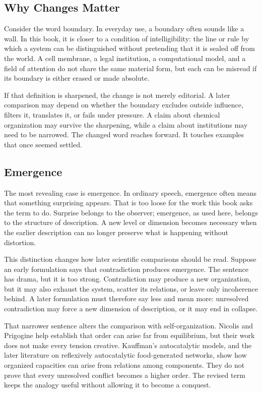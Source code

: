 \documentclass[11pt,a4paper,openany]{book}
\begin{document}
\subsection{Why Changes Matter}
Consider the word boundary. In everyday use, a boundary often sounds like a wall. In this book, it is closer to a condition of intelligibility: the line or rule by which a system can be distinguished without pretending that it is sealed off from the world. A cell membrane, a legal institution, a computational model, and a field of attention do not share the same material form, but each can be misread if its boundary is either erased or made absolute. \cite{nicolis_prigogine_selforg,kauffman_autocatalytic}\par
If that definition is sharpened, the change is not merely editorial. A later comparison may depend on whether the boundary excludes outside influence, filters it, translates it, or fails under pressure. A claim about chemical organization may survive the sharpening, while a claim about institutions may need to be narrowed. The changed word reaches forward. It touches examples that once seemed settled.\par
\subsection{Emergence}
The most revealing case is emergence. In ordinary speech, emergence often means that something surprising appears. That is too loose for the work this book asks the term to do. Surprise belongs to the observer; emergence, as used here, belongs to the structure of description. A new level or dimension becomes necessary when the earlier description can no longer preserve what is happening without distortion. \cite{nicolis_prigogine_selforg,kauffman_autocatalytic}\par
This distinction changes how later scientific comparisons should be read. Suppose an early formulation says that contradiction produces emergence. The sentence has drama, but it is too strong. Contradiction may produce a new organization, but it may also exhaust the system, scatter its relations, or leave only incoherence behind. A later formulation must therefore say less and mean more: unresolved contradiction may force a new dimension of description, or it may end in collapse.\par
That narrower sentence alters the comparison with self-organization. Nicolis and Prigogine help establish that order can arise far from equilibrium, but their work does not make every tension creative. Kauffman's autocatalytic models, and the later literature on reflexively autocatalytic food-generated networks, show how organized capacities can arise from relations among components. They do not prove that every unresolved conflict becomes a higher order. The revised term keeps the analogy useful without allowing it to become a conquest.\par
\end{document}

